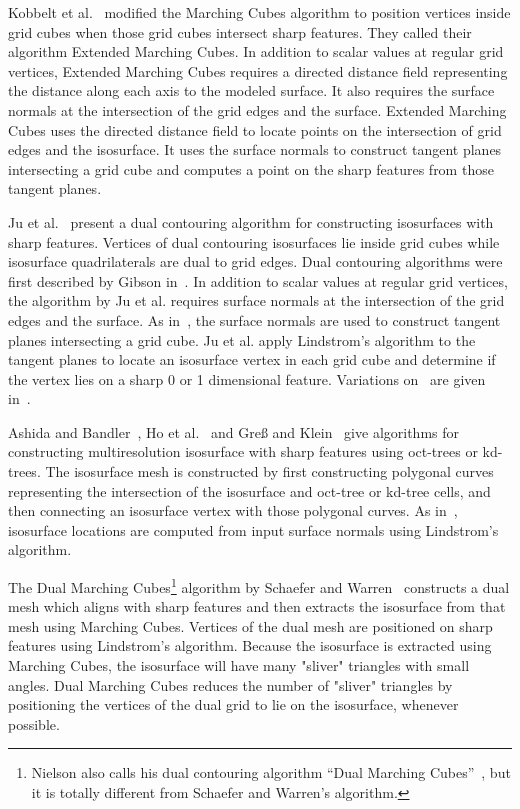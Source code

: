 Kobbelt et al.~\cite{kbsh-fssev-01} modified the Marching Cubes algorithm
to position vertices inside grid cubes when those grid cubes
intersect sharp features.
They called their algorithm Extended Marching Cubes.
In addition to scalar values at regular grid vertices,
Extended Marching Cubes requires a directed distance field
representing the distance along each axis to the modeled surface.
It also requires the surface normals
at the intersection of the grid edges and the surface.
Extended Marching Cubes uses the directed distance field
to locate points on the intersection of grid edges and the isosurface.
It uses the surface normals to construct tangent planes
intersecting a grid cube and computes a point on the sharp features
from those tangent planes.

Ju et al.~\cite{jlsw-dchd-02,sw-dcss-02} present a dual contouring algorithm
for constructing isosurfaces with sharp features.
Vertices of dual contouring isosurfaces lie inside grid cubes
while isosurface quadrilaterals are dual to grid edges.
Dual contouring algorithms were first described
by Gibson in~\cite{gh-ssqem-97,g-cesng-98}.
In addition to scalar values at regular grid vertices,
the algorithm by Ju et al. requires surface normals
at the intersection of the grid edges and the surface.
As in~\cite{kbsh-fssev-01},
the surface normals are used to construct tangent planes
intersecting a grid cube.
Ju et al. apply Lindstrom's algorithm to the tangent planes
to locate an isosurface vertex in each grid cube
and determine if the vertex lies on a sharp 0 or 1 dimensional feature.
Variations on~\cite{jlsw-dchd-02} are given 
in~\cite{zhk-dctps-04,Varadhan:2003:fss}.

Ashida and Bandler~\cite{ab-fpmmo-03}, Ho et al.~\cite{hwco-cmsaf-05}
and Gre{\ss} and Klein~\cite{gk-eretm-04} give algorithms
for constructing multiresolution isosurface with sharp features
using oct-trees or kd-trees.
The isosurface mesh is constructed
by first constructing polygonal curves representing the intersection
of the isosurface and oct-tree or kd-tree cells,
and then connecting an isosurface vertex with those polygonal curves.
As in~\cite{jlsw-dchd-02},
isosurface locations are computed from input surface normals
using Lindstrom's algorithm.

The Dual Marching Cubes\footnote{Nielson also calls his
dual contouring algorithm ``Dual Marching Cubes''~\cite{n-dmc-04},
but it is totally different from Schaefer and Warren's algorithm.}
algorithm by Schaefer and Warren~\cite{sw-dmcpc-04}
constructs a dual mesh which aligns with sharp features
and then extracts the isosurface from that mesh 
using Marching Cubes.
Vertices of the dual mesh are positioned on sharp features
using Lindstrom's algorithm.
Because the isosurface is extracted using Marching Cubes,
the isosurface will have many "sliver" triangles with small angles.
Dual Marching Cubes reduces the number of "sliver" triangles
by positioning the vertices of the dual grid to lie on the isosurface,
whenever possible.

